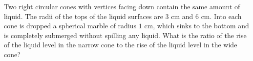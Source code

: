 Two right circular cones with vertices facing down contain the same amount of liquid. The radii of the tops of the liquid surfaces are $3$ cm and $6$ cm. Into each cone is dropped a spherical marble of radius $1$ cm, which sinks to the bottom and is completely submerged without spilling any liquid. What is the ratio of the rise of the liquid level in the narrow cone to the rise of the liquid level in the wide cone?

